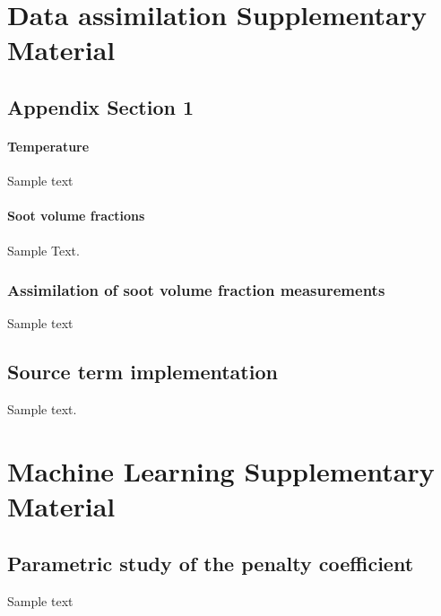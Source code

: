 \appendix

\makeatletter
\renewcommand{\@makechapterhead}[1]{\vspace *{-10\p@ }{\parindent \z@ 
\raggedright \normalfont \ifnum \c@secnumdepth >\m@ne \Huge \bfseries 
\@chapapp \space \thechapter \vskip 10\p@ \fi #1\par \nobreak \vskip 30\p@ }}
\makeatother





\chapter{Data assimilation Supplementary Material}\label{appendix:dataAssim}
\vspace*{-0.3in}

\section{Appendix Section 1}

\subsubsection{Temperature}

Sample text

\subsubsection{Soot volume fractions}


Sample Text.







\subsection{Assimilation of soot volume fraction measurements}

Sample text


\section{Source term implementation}\label{sec:enkf_source}



Sample text.


\chapter{Machine Learning Supplementary Material}\label{appendix:machLearning_suppMaterials}

\section{Parametric study of the penalty coefficient}

Sample text


